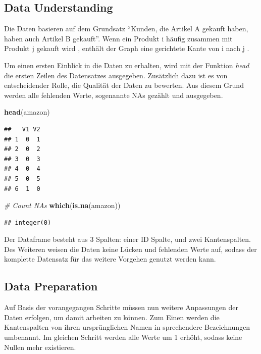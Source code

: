 \documentclass[
  12 pt,
]{article}
\newenvironment{Shaded}{\begin{snugshade}}{\end{snugshade}}
\newcommand{\CommentTok}[1]{\textcolor[rgb]{0.56,0.35,0.01}{\textit{#1}}}
\newcommand{\KeywordTok}[1]{\textcolor[rgb]{0.13,0.29,0.53}{\textbf{#1}}}
\newcommand{\NormalTok}[1]{#1}
\begin{document}
\hypertarget{data-understanding}{%
\subsection{Data Understanding}\label{data-understanding}}

Die Daten basieren auf dem Grundsatz ``Kunden, die Artikel A gekauft
haben, haben auch Artikel B gekauft''. Wenn ein Produkt i häufig
zusammen mit Produkt j gekauft wird , enthält der Graph eine gerichtete
Kante von i nach j .

Um einen ersten Einblick in die Daten zu erhalten, wird mit der Funktion
\textit{head} die ersten Zeilen des Datensatzes ausgegeben. Zusätzlich
dazu ist es von entscheidender Rolle, die Qualität der Daten zu
bewerten. Aus diesem Grund werden alle fehlenden Werte, sogenannte NAs
gezählt und ausgegeben.\\

\begin{Shaded}
\begin{Highlighting}[]
\KeywordTok{head}\NormalTok{(amazon)}
\end{Highlighting}
\end{Shaded}

\begin{verbatim}
##   V1 V2
## 1  0  1
## 2  0  2
## 3  0  3
## 4  0  4
## 5  0  5
## 6  1  0
\end{verbatim}

\begin{Shaded}
\begin{Highlighting}[]
\CommentTok{# Count NAs}
\KeywordTok{which}\NormalTok{(}\KeywordTok{is.na}\NormalTok{(amazon))}
\end{Highlighting}
\end{Shaded}

\begin{verbatim}
## integer(0)
\end{verbatim}

Der Dataframe besteht aus 3 Spalten: einer ID Spalte, und zwei
Kantenspalten. Des Weiteren weisen die Daten keine Lücken und fehlenden
Werte auf, sodass der komplette Datensatz für das weitere Vorgehen
genutzt werden kann.

\hypertarget{data-preparation}{%
\subsection{Data Preparation}\label{data-preparation}}

Auf Basis der vorangegangen Schritte müssen nun weitere Anpassungen der
Daten erfolgen, um damit arbeiten zu können. Zum Einen werden die
Kantenspalten von ihren ursprünglichen Namen in sprechendere
Bezeichnungen umbenannt. Im gleichen Schritt werden alle Werte um 1
erhöht, sodass keine Nullen mehr existieren.\\
\end{document}

